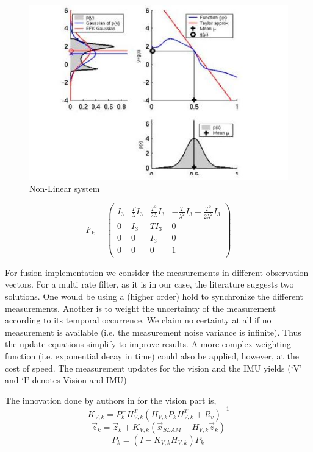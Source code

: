 \begin{figure}[!htb]
\includegraphics[width=\textwidth]{./figures/NonLinear.jpg}
\caption{Non-Linear system~\cite{ByBo2015}}
\end{figure}

\begin{equation}
F_k= 
 \begin{pmatrix}
  I_3 & \frac{T}{\lambda}I_3  & \frac{T^2}{2 \lambda} I_3& -\frac{T}{ \lambda^2} I_3 - \frac{T^2}{ 2 \lambda^2} I_3\\
  0 & I_3 & T I_3 & 0 \\
  0 & 0 & I_3 & 0 \\
  0 & 0 & 0 & 1\\
 \end{pmatrix} 
\end{equation}

For fusion implementation we consider the measurements in different observation
vectors. For a multi rate filter, as it is in our case, the literature suggests two solutions. One would be using a (higher order) hold to synchronize the different measurements. Another is to weight the uncertainty of the measurement according to its temporal occurrence. We claim no certainty at all if no
measurement is available (i.e. the measurement noise variance is infinite). Thus the update equations simplify to improve results. A more complex weighting function (i.e. exponential decay in time) could also be applied, however, at the cost of speed. The measurement updates for the vision and the IMU yields (‘V’ and ‘I’ denotes Vision and IMU)

The innovation done by authors in for the vision part is,
\begin{equation}
K_{V,k}=P_k^- H_{V,k}^T (H_{V,k} P_k H_{V,k}^T +R_v)^{-1}
\end{equation}
\begin{equation}
\overrightarrow{z}_{k}=\overrightarrow{z}_{k}+K_{V,k}(\overrightarrow{x}_{SLAM}-H_{V,k} \overrightarrow{z}_{k})
\end{equation}
\begin{equation}
P_k=(I-K_{V,k} H_{V,k}) P_k^-
\end{equation}

